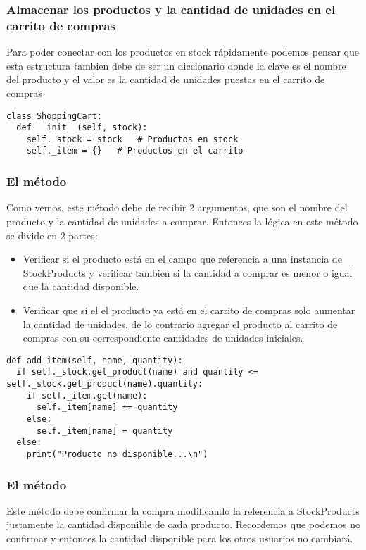 \subsubsection{Almacenar los productos y la cantidad de unidades en el carrito de compras}
Para poder conectar con los productos en stock rápidamente podemos pensar que esta estructura tambien debe de ser un diccionario donde la clave es el nombre del producto y el valor es la cantidad de unidades puestas en el carrito de compras

\begin{verbatim}
class ShoppingCart:
  def __init__(self, stock):
    self._stock = stock   # Productos en stock
    self._item = {}   # Productos en el carrito
\end{verbatim}

\subsubsection{El método }
Como vemos, este método debe de recibir 2 argumentos, que son el nombre del producto y la cantidad de unidades a comprar. Entonces la lógica en este método se divide en 2 partes:

\begin{itemize}
  \item Verificar si el producto está en el campo que referencia a una instancia de StockProducts y verificar tambien si la cantidad a comprar es menor o igual que la cantidad disponible.
  \item Verificar que si el el producto ya está en el carrito de compras solo aumentar la cantidad de unidades, de lo contrario agregar el producto al carrito de compras con su correspondiente cantidades de unidades iniciales.
\end{itemize}

\begin{verbatim}
def add_item(self, name, quantity):
  if self._stock.get_product(name) and quantity <= self._stock.get_product(name).quantity:
    if self._item.get(name):
      self._item[name] += quantity
    else:
      self._item[name] = quantity
  else:
    print("Producto no disponible...\n")
\end{verbatim}

\subsubsection{El método }
Este método debe confirmar la compra modificando la referencia a StockProducts justamente la cantidad disponible de cada producto. Recordemos que podemos no confirmar y entonces la cantidad disponible para los otros usuarios no cambiará.

